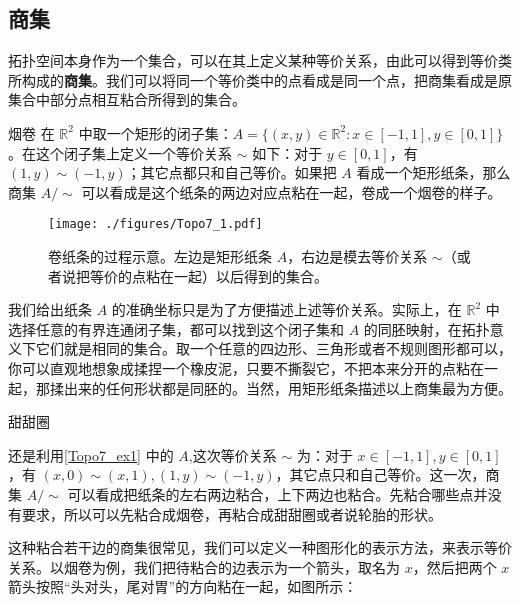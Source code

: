 

\subsection{商集}

拓扑空间本身作为一个集合，可以在其上定义某种等价关系，由此可以得到等价类所构成的\textbf{商集}。我们可以将同一个等价类中的点看成是同一个点，把商集看成是原集合中部分点相互粘合所得到的集合。

\begin{example}{烟卷}\label{Topo7_ex1}
在 $\mathbb{R}^2$ 中取一个矩形的闭子集：$A=\{(x,y)\in\mathbb{R}^2:x\in[-1,1],y\in[0,1]\}$。在这个闭子集上定义一个等价关系 $\sim$ 如下：对于 $y\in[0,1]$，有 $(1, y)\sim(-1, y)$；其它点都只和自己等价。如果把 $A$ 看成一个矩形纸条，那么商集 $A/\sim$ 可以看成是这个纸条的两边对应点粘在一起，卷成一个烟卷的样子。

\begin{figure}[ht]
\centering
\texttt{[image: ./figures/Topo7\_1.pdf]}
\caption{卷纸条的过程示意。左边是矩形纸条 $A$，右边是模去等价关系 $\sim$（或者说把等价的点粘在一起）以后得到的集合。} \label{Topo7_fig1}
\end{figure}

\end{example}



我们给出纸条 $A$ 的准确坐标只是为了方便描述上述等价关系。实际上，在 $\mathbb{R}^2$ 中选择任意的有界连通闭子集，都可以找到这个闭子集和 $A$ 的同胚映射，在拓扑意义下它们就是相同的集合。取一个任意的四边形、三角形或者不规则图形都可以，你可以直观地想象成揉捏一个橡皮泥，只要不撕裂它，不把本来分开的点粘在一起，那揉出来的任何形状都是同胚的。当然，用矩形纸条描述以上商集最为方便。

\begin{example}{甜甜圈}

还是利用\autoref{Topo7_ex1} 中的 $A$,这次等价关系 $\sim$ 为：对于 $x\in[-1,1], y\in[0,1]$，有 $(x,0)\sim(x,1), (1, y)\sim(-1, y)$，其它点只和自己等价。这一次，商集 $A/\sim$ 可以看成把纸条的左右两边粘合，上下两边也粘合。先粘合哪些点并没有要求，所以可以先粘合成烟卷，再粘合成甜甜圈或者说轮胎的形状。

\end{example}

这种粘合若干边的商集很常见，我们可以定义一种图形化的表示方法，来表示等价关系。以烟卷为例，我们把待粘合的边表示为一个箭头，取名为 $x$，然后把两个 $x$ 箭头按照“头对头，尾对胃”的方向粘在一起，如图所示：

